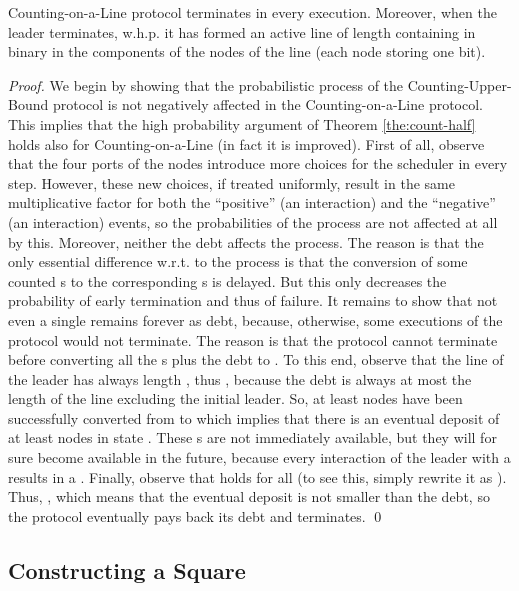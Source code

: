 \documentclass[oribibl, 11pt]{llncs}
\begin{document}
\begin{lemma} \label{lem:counting-line}
Counting-on-a-Line protocol terminates in every execution. Moreover, when the leader terminates, w.h.p. it has formed an active line of length  containing  in binary in the  components of the nodes of the line (each node storing one bit).
\end{lemma}
\begin{proof}
We begin by showing that the probabilistic process of the Counting-Upper-Bound protocol is not negatively affected in the Counting-on-a-Line protocol. This implies that the high probability argument of Theorem \ref{the:count-half} holds also for Counting-on-a-Line (in fact it is improved). First of all, observe that the four ports of the nodes introduce more choices for the scheduler in every step. However, these new choices, if treated uniformly, result in the same multiplicative factor for both the ``positive'' (an  interaction) and the ``negative'' (an  interaction) events, so the probabilities of the process are not affected at all by this. Moreover, neither the debt affects the process. The reason is that the only essential difference w.r.t. to the process is that the conversion of some counted s to the corresponding s is delayed. But this only decreases the probability of early termination and thus of failure. It remains to show that not even a single  remains forever as debt, because, otherwise, some executions of the protocol would not terminate. The reason is that the protocol cannot terminate before converting all the s plus the debt to . To this end, observe that the line of the leader has always length , thus , because the debt is always at most the length of the line excluding the initial leader. So, at least  nodes have been successfully converted from  to  which implies that there is an eventual deposit of at least  nodes in state . These s are not immediately available, but they will for sure become available in the future, because every interaction of the leader with a  results in a . Finally, observe that  holds for all  (to see this, simply rewrite it as ). Thus, , which means that the eventual deposit is not smaller than the debt, so the protocol eventually pays back its debt and terminates.
\qed
\end{proof}

\subsection{Constructing a  Square}
\label{subsec:repl-square}
\end{document}
